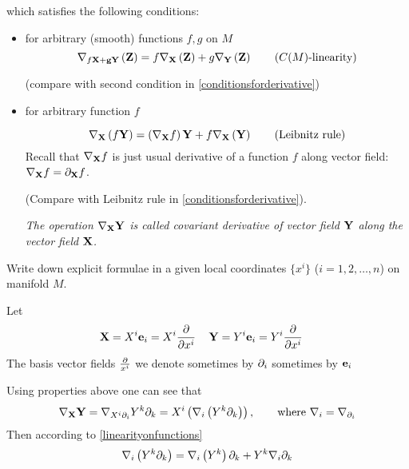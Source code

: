\documentclass[12pt]{article}
\theoremstyle{theorem}
\numberwithin{equation}{section}
\begin{document}
\noindent which satisfies the following conditions:


\begin{itemize}

\item

for arbitrary (smooth) functions $f,g$ on $M$
\begin{equation}\label{linearityonfunctions}
  \nabla_{f\bf X+g\bf Y}\left({\bf Z}\right)=
   f\nabla_{\bf X}\left({\bf Z}\right)+
   g\nabla_{\bf Y}\left({\bf Z}\right)\qquad
   \hbox {($C(M)$-linearity)}
\end{equation}


(compare with second condition in \eqref{conditionsforderivative})

\item
for arbitrary function $f$


\begin{equation}\label{leibnitzrule}
  \nabla_{\bf X} \left( f\bf Y \right)=
   \left(\nabla_{\bf X}f\right){\bf Y}+
   f\nabla_{\bf X}\left({\bf Y}\right)\qquad
   \hbox {(Leibnitz rule)}
\end{equation}
Recall that $\nabla_{\bf X} f$ is just usual derivative of a function $f$ along vector field:
$\nabla_{\bf X} f=\partial_{\bf X} f$.

(Compare with Leibnitz rule in \eqref{conditionsforderivative}).

{\it The operation $\nabla_{\bf X}{\bf Y}$ is called  covariant derivative
of vector field ${\bf Y}$ along the vector field ${\bf X}$.}


\end{itemize}



  Write down explicit formulae in a given local coordinates $\{x^i\}$ ($i=1,2,\dots,n$) on manifold $M$.

Let
         $$
      {\bf X}=X^i{\bf e}_i=X^i{\partial\over \partial x^i}\,\quad {\bf Y}=Y^i{\bf e}_i=Y^i{\partial\over \partial x^i}\,\quad
         $$
The basis vector fields ${\partial\over x^i}$ we denote sometimes by $\partial_i$ sometimes by ${\bf e}_i$


  Using properties above one can see that
\begin{equation}\label{explicitexpression}
  \nabla_{\bf X}{\bf Y}=\nabla_{X^i\partial_i}{Y^k \partial_k}
  =X^i\left(\nabla_i\left(Y^k\partial_k\right)\right),\qquad
  \hbox{where $\nabla_i=\nabla_{\partial_i}$}
\end{equation}
Then  according to \eqref{linearityonfunctions}
                 $$
           \nabla_i
            \left(
             Y^k \partial_k
            \right)=
              \nabla_i
              \left(Y^k\right)\partial_k+
            Y^k \nabla_i \partial_k
                   $$
\end{document}
